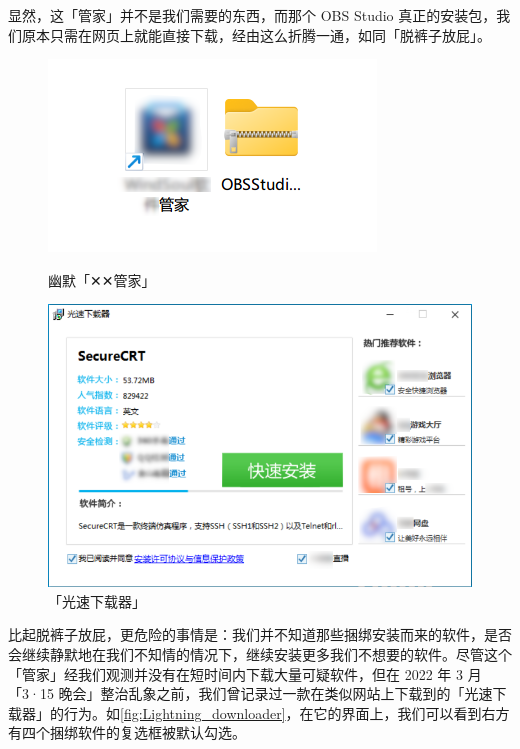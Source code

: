 {{显然，这「管家」并不是我们需要的东西，而那个 OBS Studio 真正的安装包，我们原本只需在网页上就能直接下载，经由这么折腾一通，如同「脱裤子放屁」。

\begin{figure}[htb!]
  \centering
  \begin{minipage}{.44\textwidth}
    \centering
    \includegraphics[width=.9\textwidth]{assets/basic/Unwanted_software.png}
    \caption{幽默「✕✕管家」}
    \label{fig:Unwanted_software}
  \end{minipage}
  \begin{minipage}{.55\textwidth}
    \centering
    \includegraphics[width=.95\textwidth]{assets/basic/Lightning_downloader.png}
    \caption{「光速下载器」}
    \label{fig:Lightning_downloader}
  \end{minipage} 
\end{figure}

比起脱裤子放屁，更危险的事情是：我们并不知道那些捆绑安装而来的软件，是否会继续静默地在我们不知情的情况下，继续安装更多我们不想要的软件。尽管这个「管家」经我们观测并没有在短时间内下载大量可疑软件，但在 2022 年 3 月「3·15 晚会」整治乱象之前，我们曾记录过一款在类似网站上下载到的「光速下载器」的行为。如\autoref{fig:Lightning_downloader}，在它的界面上，我们可以看到右方有四个捆绑软件的复选框被默认勾选。

}}
